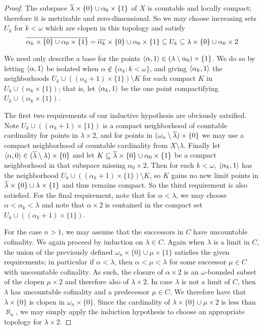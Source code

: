 \documentclass{amsart}
\theoremstyle{plain}
\theoremstyle{definition}
\theoremstyle{remark}
\theoremstyle{plain}
\theoremstyle{definition}
\theoremstyle{remark}
\begin{document}
\begin{proof}
    The subspace \(\overline{\lambda}\times\{0\}\cup\alpha_0\times\{1\}\) of \(X\)
    is countable and locally compact; therefore it is
    metrizable and zero-dimensional.
    So we may choose increasing sets \(U_k\) for \(k<\omega\) which are
    clopen in this topology and satisfy
    \[
      \overline{\alpha_k\times\{0\}\cup\alpha_0\times\{1\}}
        =
      \overline{\alpha_k}\times\{0\}\cup\alpha_0\times\{1\}
        \subseteq
      U_k
        \subseteq
      \lambda\times\{0\}\cup\alpha_0\times 2
    \]

    We need only describe a base for the points
    \(\langle\alpha,1\rangle\in(\lambda\setminus\alpha_0)\times\{1\}\).
    We do so by letting
    \(\langle\alpha,1\rangle\) be isolated when \(\alpha\not\in\{\alpha_k:k<\omega\}\),
    and giving \(\langle\alpha_k,1\rangle\) the neighborhoods
    \(U_k\cup((\alpha_k+1)\times\{1\})\setminus K\)
    for each compact \(K\) in \(U_k\cup(\alpha_k\times\{1\})\); that is,
    let \(\langle\alpha_k,1\rangle\) be the one point compactifying
    \(U_k\cup(\alpha_k\times\{1\})\).

    The first two requirements of our inductive hypothesis are obviously
    satsified. Note \(U_k\cup((\alpha_k+1)\times\{1\})\) is
    a compact neighborhood of countable cardinality
    for points in \(\lambda\times 2\), and for points in
    \((\omega_n\setminus\overline{\lambda})\times\{0\}\) we may use a compact
    neighborhood of countable cardinality from \(X\setminus\lambda\).
    Finally let \(\langle\alpha,0\rangle\in(\overline{\lambda}\setminus\lambda)\times\{0\}\)
    and let \(K\subseteq\overline{\lambda}\times\{0\}\cup\alpha_0\times\{1\}\) be a
    compact neighborhood in that subspace missing \(\alpha_0\times 2\).
    Then for each \(k<\omega\), \(\langle\alpha_k,1\rangle\) has the neighborhood
    \(U_k\cup((\alpha_k+1)\times\{1\})\setminus K\),
    so \(K\) gains no new limit points in
    \(\overline{\lambda}\times\{0\}\cup\lambda\times\{1\}\) and thus remains compact.
    So the third requirement is also satisfied.
    For the final requirement, note that for \(\alpha<\lambda\), we may
    choose \(\alpha<\alpha_k<\lambda\) and note that
    \(\alpha\times 2\) is contained in the compact
    set \(U_k\cup((\alpha_k+1)\times\{1\})\).

    For the case \(n>1\), we may assume that the successors in \(C\)
    have uncountable cofinality.
    We again proceed by induction on \(\lambda\in C\).  Again when
    \(\lambda\) is a limit in \(C\), the union of the previously defined
    \(\omega_n\times\{0\}\cup\mu\times\{1\}\) satisfies the given
    requirements; in particular if \(\alpha<\lambda\), then
    \(\alpha<\mu<\lambda\) for some successor \(\mu\in C\) with uncountable
    cofinality. As such, the closure of \(\alpha\times2\) is
    an \(\omega\)-bounded subset of the clopen \(\mu\times 2\) and
    therefore also of \(\lambda\times 2\).
    In case \(\lambda\) is not a limit of \(C\), then \(\lambda\)
    has uncountable cofinality and a predecessor \(\mu\in C\).
    We therefore have that \(\lambda\times\{0\}\) is clopen
    in \(\omega_n\times \{0\}\). Since the cardinality of
    \(\lambda\times \{0\} \cup \mu\times 2\) is less than \(\aleph_n\),
    we may simply apply the induction hypothesis
    to choose an appropriate topology for \(\lambda\times 2\).


\end{proof}
\end{document}
